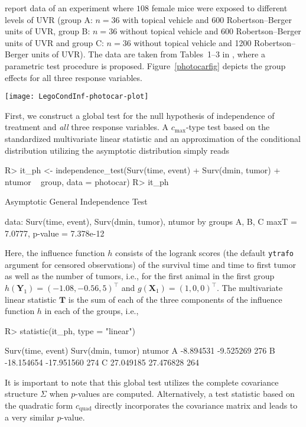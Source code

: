 \documentclass{article}
\newcommand{\Robject}[1]{\texttt{#1}}
\newcommand{\Rcmd}[1]{\texttt{#1}}
\newcommand{\X}{\mathbf{X}}
\newcommand{\Y}{\mathbf{Y}}
\newcommand{\T}{\mathbf{T}}
\newenvironment{Schunk}{}{}
\begin{document}
\cite{Molefeetal2005} report data of an experiment where
$108$ female mice were exposed to different levels 
of UVR (group A: $n = 36$ with topical vehicle and 600 Robertson--Berger units 
of UVR, group B: $n = 36$ without topical vehicle and 600 Robertson--Berger units of UVR and group C: 
$n = 36$ without topical vehicle and 1200 Robertson--Berger units of UVR). 
The data are taken from Tables~1--3 in \cite{Molefeetal2005}, where a 
parametric test procedure is proposed.  Figure~\ref{photocarfig} depicts
the group effects for all three response variables. 


\begin{sidewaysfigure}
\begin{center}
\texttt{[image: LegoCondInf-photocar-plot]}
\caption{\Robject{photocar} data: 
         Kaplan-Meier estimates of time to death and time to first tumor as
         well as boxplots of the total number of tumors in three treatment
         groups. \label{photocarfig}}
\end{center}
\end{sidewaysfigure}
First, we construct a global test for the null hypothesis of independence
of treatment and \textit{all} three response variables. A
$c_\text{max}$-type test based on the standardized multivariate          
linear statistic and an approximation of the conditional distribution
utilizing the asymptotic distribution simply reads
\begin{Schunk}
\begin{Sinput}
R> it_ph <- independence_test(Surv(time, event) + Surv(dmin, 
       tumor) + ntumor ~ group, data = photocar)
R> it_ph
\end{Sinput}
\begin{Soutput}
	Asymptotic General Independence Test

data:  Surv(time, event), Surv(dmin, tumor), ntumor by groups A, B, C 
maxT = 7.0777, p-value = 7.378e-12
\end{Soutput}
\end{Schunk}
Here, the influence function $h$ consists of the logrank scores 
(the default \Rcmd{ytrafo} argument for censored observations) of the survival
time and time to first tumor as well as the number of tumors, i.e., for the 
first animal in the first group $h(\Y_1) =
( -1.08,-0.56,5 )^\top$
and $g(\X_1) = (1, 0, 0)^\top$. The multivariate linear statistic $\T$ is the sum of each of
the three components of the influence function $h$ in each of the groups,
i.e.,
\begin{Schunk}
\begin{Sinput}
R> statistic(it_ph, type = "linear")
\end{Sinput}
\begin{Soutput}
  Surv(time, event) Surv(dmin, tumor) ntumor
A         -8.894531         -9.525269    276
B        -18.154654        -17.951560    274
C         27.049185         27.476828    264
\end{Soutput}
\end{Schunk}
It is important to note that this global test utilizes the complete
covariance structure $\Sigma$
when $p$-values are computed.
Alternatively, a test statistic based on the quadratic form $c_\text{quad}$
directly incorporates the covariance matrix and leads to a very similar 
$p$-value. 
\end{document}
